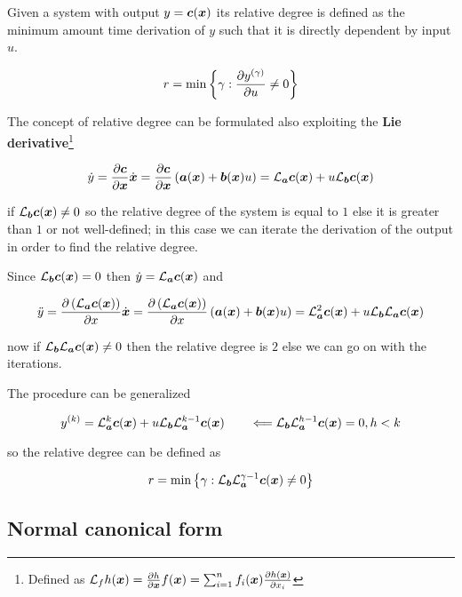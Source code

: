 Given a system with output $y=\vect c(\x)$ its relative degree is defined as the minimum amount time derivation of $y$ such that it is directly dependent by input $u$.

\[
    r = \min \left\{ \gamma : \pd{y^{(\gamma)}}{u} \neq 0 \right\}
\]

The concept of relative degree can be formulated also exploiting the \textbf{Lie derivative}\footnote{Defined as $\Lie{f} h(\x) = \pd{h}{\x} f(\x) = \sum_{i=1}^{n} f_i(\x) \pd{h(\x)}{x_i}$}

\[
    \dot y =
    \pd{\vect c}{\x} \dx =
    \pd{\vect c}{\x} \left(\vect a(\x) + \vect b(\x) u\right) =
    \Lie{\vect a} \vect c(\x) + u \Lie{\vect b} \vect c(\x)
\]

if $\Lie{\vect b} \vect c(\x) \neq 0$ so the relative degree of the system is equal to $1$ else it is greater than $1$ or not well-defined;
in this case we can iterate the derivation of the output in order to find the relative degree.

Since $\Lie{\vect b} \vect c(\x) = 0$ then $\dot y = \Lie{\vect a} \vect c(\x)$ and

\[
    \ddot y =
    \pd{\left( \Lie{\vect a} \vect c(\x) \right)}{x} \dx =
    \pd{\left( \Lie{\vect a} \vect c(\x) \right)}{x} \left(\vect a(\x) + \vect b(\x) u\right) =
    \Lie{\vect a}^2 \vect c(\x) + u \Lie{\vect b} \Lie{\vect a} \vect c(\x)
\]

now if $\Lie{\vect b} \Lie{\vect a} \vect c(\x) \neq 0$ then the relative degree is $2$ else we can go on with the iterations.

The procedure can be generalized

\begin{equation}\label{eqn:output-via-lie}
    y^{(k)} = \Lie{\vect a}^k \vect c(\x) + u \Lie{\vect b} \Lie{\vect a}^{k-1} \vect c(\x) \qquad \Longleftarrow \Lie{\vect b} \Lie{\vect a}^{h-1} \vect c(\x) = 0, h < k
\end{equation}

so the relative degree can be defined as

\[
    r = \min \left\{ \gamma : \Lie{\vect b} \Lie{\vect a}^{\gamma-1} \vect c(\x) \neq 0 \right\}
\]

\subsection{Normal canonical form}


